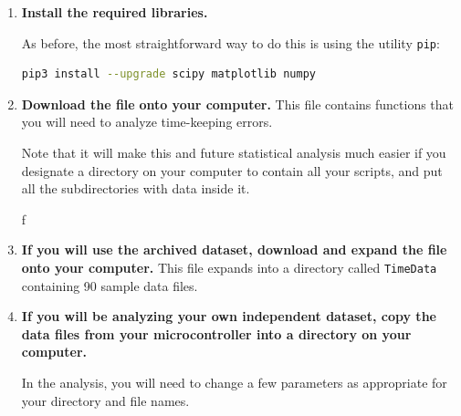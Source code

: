 \begin{enumerate}
	\item \textbf{Install the required \python libraries.}
	
	As before, the most straightforward way to do this is using the utility \lstinline{pip}:
\begin{lstlisting}[language=bash]
pip3 install --upgrade scipy matplotlib numpy
\end{lstlisting}	
	
	\item \textbf{Download the file}  \textbf{ onto your computer.}
	This file contains functions that you will need to analyze time-keeping errors.
	
	\smallskip
	Note that it will make this and future statistical analysis much easier if you designate a directory on your computer to contain all your \python scripts, and put all the subdirectories with data inside it.
	
	f
	\item \textbf{If you will use the archived dataset, download and expand the file}  \textbf{ onto your computer.}
	This file expands into a directory called \lstinline{TimeData} containing 90 sample data files.
		
	\item \textbf{If you will be analyzing your own independent dataset, copy the data files from your microcontroller into a directory on your computer.}
	
	In the analysis, you will need to change a few parameters as appropriate for your directory and file names.
	

\end{enumerate}
